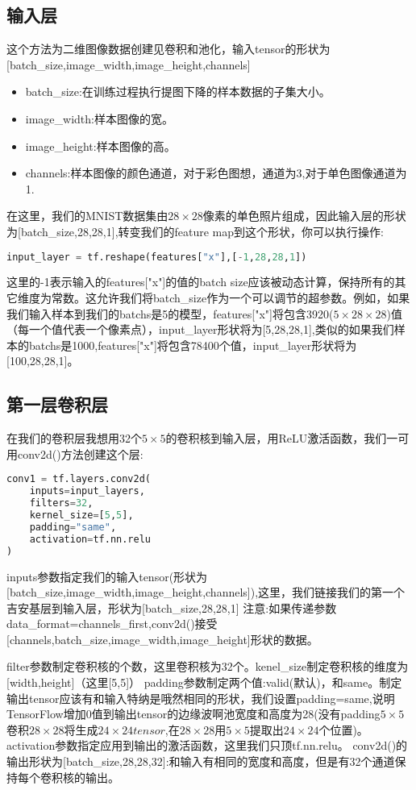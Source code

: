 \subsection{输入层}
 这个方法为二维图像数据创建见卷积和池化，输入tensor的形状为[batch\_size,image\_width,image\_height,channels]
\begin{itemize}
\item batch\_size:在训练过程执行提图下降的样本数据的子集大小。
\item image\_width:样本图像的宽。
\item image\_height:样本图像的高。
\item channels:样本图像的颜色通道，对于彩色图想，通道为3,对于单色图像通道为1.
\end{itemize}
在这里，我们的MNIST数据集由$28\times28$像素的单色照片组成，因此输入层的形状为[batch\_size,28,28,1],转变我们的feature map到这个形状，你可以执行操作:
\begin{lstlisting}[language=Python]
input_layer = tf.reshape(features["x"],[-1,28,28,1])
\end{lstlisting}
这里的-1表示输入的features["x"]的值的batch size应该被动态计算，保持所有的其它维度为常数。这允许我们将batch\_size作为一个可以调节的超参数。例如，如果我们输入样本到我们的batchs是5的模型，features["x"]将包含3920($5\times28\times28$)值（每一个值代表一个像素点），input\_layer形状将为[5,28,28,1],类似的如果我们样本的batchs是1000,features["x"]将包含78400个值，input\_layer形状将为[100,28,28,1]。
\subsection{第一层卷积层}
在我们的卷积层我想用32个$5\times5$的卷积核到输入层，用ReLU激活函数，我们一可用conv2d()方法创建这个层:
\begin{lstlisting}[language=Python]
conv1 = tf.layers.conv2d(
    inputs=input_layers,
    filters=32,
    kernel_size=[5,5],
    padding="same",
    activation=tf.nn.relu
)
\end{lstlisting}
\begin{displayquote}
inputs参数指定我们的输入tensor(形状为[batch\_size,image\_width,image\_height,channels]),这里，我们链接我们的第一个吉安基层到输入层，形状为[batch\_size,28,28,1]
注意:如果传递参数data\_format=channels\_first,conv2d()接受[channels,batch\_size,image\_width,image\_height]形状的数据。
\end{displayquote}
filter参数制定卷积核的个数，这里卷积核为32个。kenel\_size制定卷积核的维度为[width,height]（这里[5,5]）
padding参数制定两个值:valid(默认)，和same。制定输出tensor应该有和输入特纳是哦然相同的形状，我们设置padding=same,说明TensorFlow增加0值到输出tensor的边缘波啊池宽度和高度为28(没有padding$5\times5$卷积$28\times28$将生成$24\times24tensor$,在$28\times28$用$5\times5$提取出$24\times24$个位置)。
activation参数指定应用到输出的激活函数，这里我们只顶tf.nn.relu。
conv2d()的输出形状为[batch\_size,28,28,32]:和输入有相同的宽度和高度，但是有32个通道保持每个卷积核的输出。
